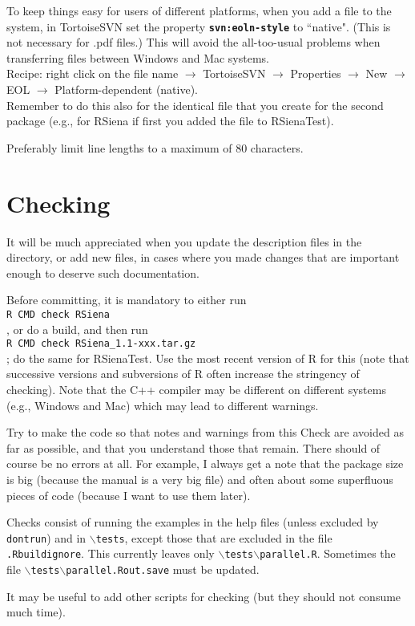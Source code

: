 \documentclass[12pt, a4paper]{article}
\renewcommand{\=}{\,=\,}
\newcommand{\+}{\,+\,}
\newcommand{\sfn}[1]{\textbf{\texttt{#1}}}
\newcommand{\bs}{\backslash}
\newcommand{\RS}{{\sf RSiena }}
\newcommand{\rst}{{\sf RSienaTest}}
\begin{document}
To keep things easy for users of different platforms, when you add a file to the system,
in TortoiseSVN set the property \sfn{svn:eoln-style} to ``native".
(This is not necessary for .pdf files.)
This will avoid the all-too-usual problems when transferring files between Windows and Mac systems.\\
Recipe: right click on the file name $\rightarrow$ TortoiseSVN $\rightarrow$ Properties  $\rightarrow$
New  $\rightarrow$ EOL  $\rightarrow$ Platform-dependent (native).\\
Remember to do this also for the identical file that you create for the second package (e.g., for \RS if
first you added the file to \rst).

Preferably limit line lengths to a maximum of 80 characters.

\section{Checking}


 It will be much appreciated when you update the description files in
 the  directory, or add new files, in cases where you made changes that are
 important enough to deserve such documentation.

  Before committing, it is mandatory to either run \\
  \verb|R CMD check RSiena|\\
  , or do a build, and then run \\
  \verb|R CMD check RSiena_1.1-xxx.tar.gz|\\
  ; do the same for \rst.
  Use the most recent version of R for this (note that
  successive versions and subversions of R often increase the stringency of checking).
  Note that the C++ compiler may be different on different systems (e.g., Windows and Mac)
  which may lead to different warnings.

  Try to make the code so that notes and warnings from this Check are avoided as far as possible,
  and that you understand those that remain.
  There should of course be no errors at all.
  For example, I always get a note that the package size is big
  (because the manual is a very big file) and
  often about some superfluous pieces of code (because I want to use them later).

  Checks consist of running the examples in the help files (unless excluded by \texttt{dontrun})
  and in \texttt{$\bs$tests}, except those that are excluded in the file \texttt{.Rbuildignore}.
  This currently leaves only \texttt{$\bs$tests$\bs$parallel.R}.
  Sometimes the file \texttt{$\bs$tests$\bs$parallel.Rout.save} must be updated.

  It may be useful to add other scripts for checking (but they should not consume much time).
\end{document}
